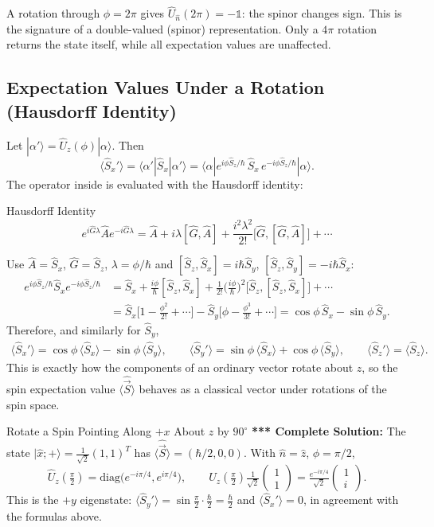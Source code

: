 \documentclass[11pt,a4paper]{article}
\begin{document}
A rotation through $\phi=2\pi$ gives $\hat U_{\hat n}(2\pi)=-\mathbb 1$: the spinor changes sign. This is the signature of a double-valued (spinor) representation. Only a $4\pi$ rotation returns the state itself, while all expectation values are unaffected.

\subsection{Expectation Values Under a Rotation (Hausdorff Identity)}
Let $|\alpha'\rangle=\hat U_z(\phi)|\alpha\rangle$. Then
\[
\langle\hat S_x'\rangle=\langle\alpha'|\hat S_x|\alpha'\rangle=\langle\alpha|e^{i\phi\hat S_z/\hbar}\,\hat S_x\,e^{-i\phi\hat S_z/\hbar}|\alpha\rangle .
\]
The operator inside is evaluated with the Hausdorff identity:
\begin{thm}{Hausdorff Identity}
\[
e^{i\hat G\lambda}\hat Ae^{-i\hat G\lambda}=\hat A+i\lambda[\hat G,\hat A]+\frac{i^2\lambda^2}{2!}\big[\hat G,[\hat G,\hat A]\big]+\cdots
\]
\end{thm}
Use $\hat A=\hat S_x$, $\hat G=\hat S_z$, $\lambda=\phi/\hbar$ and $[\hat S_z,\hat S_x]=i\hbar\hat S_y$, $[\hat S_z,\hat S_y]=-i\hbar\hat S_x$:
\begin{align*}
e^{i\phi\hat S_z/\hbar}\hat S_xe^{-i\phi\hat S_z/\hbar}&=\hat S_x+\frac{i\phi}\hbar[\hat S_z,\hat S_x]+\frac1{2!}\Big(\frac{i\phi}\hbar\Big)^2\big[\hat S_z,[\hat S_z,\hat S_x]\big]+\cdots\\
&=\hat S_x\Big[1-\frac{\phi^2}{2!}+\cdots\Big]-\hat S_y\Big[\phi-\frac{\phi^3}{3!}+\cdots\Big]=\cos\phi\,\hat S_x-\sin\phi\,\hat S_y .
\end{align*}
Therefore, and similarly for $\hat S_y$,
\begin{gather*}
\langle\hat S_x'\rangle=\cos\phi\,\langle\hat S_x\rangle-\sin\phi\,\langle\hat S_y\rangle,\qquad
\langle\hat S_y'\rangle=\sin\phi\,\langle\hat S_x\rangle+\cos\phi\,\langle\hat S_y\rangle,\qquad
\langle\hat S_z'\rangle=\langle\hat S_z\rangle .
\end{gather*}
This is exactly how the components of an ordinary vector rotate about $z$, so the spin expectation value $\langle\hat{\vec S}\rangle$ behaves as a classical vector under rotations of the spin space.

\begin{prob}{Rotate a Spin Pointing Along $+x$ About $z$ by $90^\circ$}
\textbf{*** Complete Solution:} The state $|\hat x;+\rangle=\tfrac1{\sqrt2}(1,1)^T$ has $\langle\hat{\vec S}\rangle=(\hbar/2,0,0)$. With $\hat n=\hat z$, $\phi=\pi/2$,
\[
\hat U_z(\tfrac\pi2)=\mathrm{diag}\big(e^{-i\pi/4},e^{i\pi/4}\big),\qquad
\hat U_z(\tfrac\pi2)\tfrac1{\sqrt2}\begin{pmatrix}1\\1\end{pmatrix}=\tfrac{e^{-i\pi/4}}{\sqrt2}\begin{pmatrix}1\\i\end{pmatrix}.
\]
This is the $+y$ eigenstate: $\langle\hat S_y'\rangle=\sin\tfrac\pi2\cdot\tfrac\hbar2=\tfrac\hbar2$ and $\langle\hat S_x'\rangle=0$, in agreement with the formulas above.
\end{prob}
\end{document}

